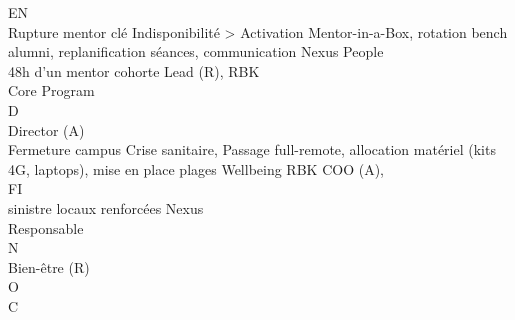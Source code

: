 \documentclass[12pt,landscape,a4paper]{article}
\begin{document}
\vspace{0.5em}
\vspace{0.5em}
\vspace{0.5em}
\vspace{0.5em}
EN\\
Rupture mentor clé Indisponibilité \textgreater{}   Activation Mentor-in-a-Box, rotation bench alumni, replanification séances, communication Nexus People\\
48h d’un mentor     cohorte                                                                                       Lead (R), RBK\\
Core                                                                                                              Program\\
\vspace{0.5em}
\vspace{0.5em}
\vspace{0.5em}
\vspace{0.5em}
D\\
Director (A)\\
Fermeture campus Crise sanitaire,      Passage full-remote, allocation matériel (kits 4G, laptops), mise en place plages Wellbeing RBK COO (A),\\
\vspace{0.5em}
\vspace{0.5em}
\vspace{0.5em}
FI\\
sinistre locaux       renforcées                                                                                    Nexus\\
Responsable\\
N\\
Bien-être (R)\\
O\\
C\\
\vspace{0.5em}
\end{document}

